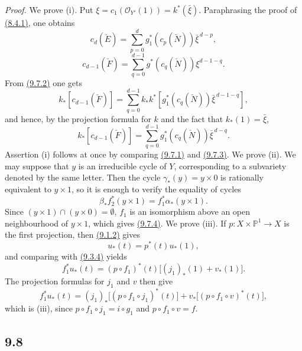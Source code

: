 \documentclass[11pt]{article}
\begin{document}
\emph{Proof.} We prove (i). Put $\xi=c_1(\mathcal O_{Y'}(1))=k^*(\bar\xi)$. Paraphrasing the proof of \hyperref[sga5:VII:lemma:8.4.1]{(8.4.1)}, one obtains
\[
c_d(\check E)=\sum_{p=0}^d g_1^*(c_p(\check N))\bar\xi^{\,d-p},
\tag{9.7.1}\label{sga5:VII:equation:9.7.1}
\]
\[
c_{d-1}(\check F)=\sum_{q=0}^{d-1}g^*(c_q(\check N))\xi^{d-1-q}.
\tag{9.7.2}\label{sga5:VII:equation:9.7.2}
\]
From \hyperref[sga5:VII:equation:9.7.2]{(9.7.2)} one gets
\[
k_*[c_{d-1}(\check F)]
=\sum_{q=0}^{d-1}k_*k^*[g_1^*(c_q(\check N))\bar\xi^{\,d-1-q}],
\]
and hence, by the projection formula for $k$ and the fact that $k_*(1)=\bar\xi$,
\[
k_*[c_{d-1}(\check F)]=\sum_{q=0}^{d-1}g_1^*(c_q(\check N))\bar\xi^{\,d-q}.
\tag{9.7.3}\label{sga5:VII:equation:9.7.3}
\]
Assertion (i) follows at once by comparing \hyperref[sga5:VII:equation:9.7.1]{(9.7.1)} and \hyperref[sga5:VII:equation:9.7.3]{(9.7.3)}. We prove (ii). We may suppose that $y$ is an irreducible cycle of $Y$, corresponding to a subvariety denoted by the same letter. Then the cycle $\gamma_*(y)=y\times0$ is rationally equivalent to $y\times1$, so it is enough to verify the equality of cycles
\[
\beta_*f_2^*(y\times1)=f_1^*\alpha_*(y\times1).
\tag{9.7.4}\label{sga5:VII:equation:9.7.4}
\]
Since $(y\times1)\cap(y\times0)=\emptyset$, $f_1$ is an isomorphism above an open neighbourhood of $y\times1$, which gives \hyperref[sga5:VII:equation:9.7.4]{(9.7.4)}. We prove (iii). If $p:X\times\mathbb P^1\to X$ is the first projection, then \hyperref[sga5:VII:equation:9.1.2]{(9.1.2)} gives
\[
u_*(t)=p^*(t)u_*(1),
\tag{9.7.5}\label{sga5:VII:equation:9.7.5}
\]
and comparing with \hyperref[sga5:VII:equation:9.3.4]{(9.3.4)} yields
\[
f_1^*u_*(t)=(p\circ f_1)^*(t)\bigl[(j_1)_*(1)+v_*(1)\bigr].
\tag{9.7.6}\label{sga5:VII:equation:9.7.6}
\]
The projection formulas for $j_1$ and $v$ then give
\[
f_1^*u_*(t)=(j_1)_*\bigl[(p\circ f_1\circ j_1)^*(t)\bigr]+v_*\bigl[(p\circ f_1\circ v)^*(t)\bigr],
\tag{9.7.7}\label{sga5:VII:equation:9.7.7}
\]
which is (iii), since $p\circ f_1\circ j_1=i\circ g_1$ and $p\circ f_1\circ v=f$.

\subsection*{9.8}\label{sga5:VII:subsection:9.8}
\end{document}
